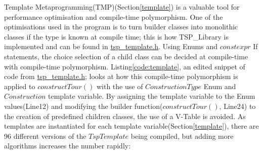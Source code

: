 Template Metaprogramming(TMP)(Section\ref{template}) is a valuable tool for performance optimisation and compile-time polymorphism. One of the optimisations used in the program is to turn builder classes into monolithic classes if the type is known at compile time; this is how TSP\_Library is implemented and can be found in \href{https://github.com/AndrewF001/Dissertation/blob/main/TSP_Solution/TSP_Library/tsp_template.h}{tsp\_template.h}. Using Enums and $constexpr$ If statements, the choice selection of a child class can be decided at compile-time with compile-time polymorphism. Listing\ref{code:template}, an edited snippet of code from \href{https://github.com/AndrewF001/Dissertation/blob/main/TSP_Solution/TSP_Library/tsp_template.h}{tsp\_template.h}; looks at how this compile-time polymorphism is applied to $constructTour()$ with the use of $ConstructionType$ Enum and $Construction$ template variable. By assigning the template variable to the Enum values(Line12) and modifying the builder function($constructTour()$, Line24) to the creation of predefined children classes, the use of a V-Table is avoided. As templates are instantiated for each template variable(Section\ref{template}), there are 96 different versions of the $TspTemplate$ being compiled, but adding more algorithms increases the number rapidly:

